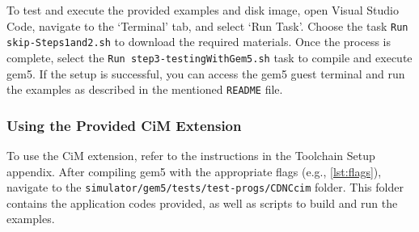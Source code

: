 To test and execute the provided examples and disk image, open Visual Studio Code, navigate to the `Terminal' tab, and select `Run Task'. Choose the task \texttt{Run skip-Steps1and2.sh} to download the required materials. Once the process is complete, select the \texttt{Run step3-testingWithGem5.sh} task to compile and execute gem5. If the setup is successful, you can access the gem5 guest terminal and run the examples as described in the mentioned \texttt{README} file.

\subsubsection*{Using the Provided CiM Extension}
To use the CiM extension, refer to the instructions in the Toolchain Setup appendix. After compiling gem5 with the appropriate flags (e.g., \cref{lst:flags}), navigate to the \texttt{simulator/gem5/tests/test-progs/CDNCcim} folder. This folder contains the application codes provided, as well as scripts to build and run the examples.
